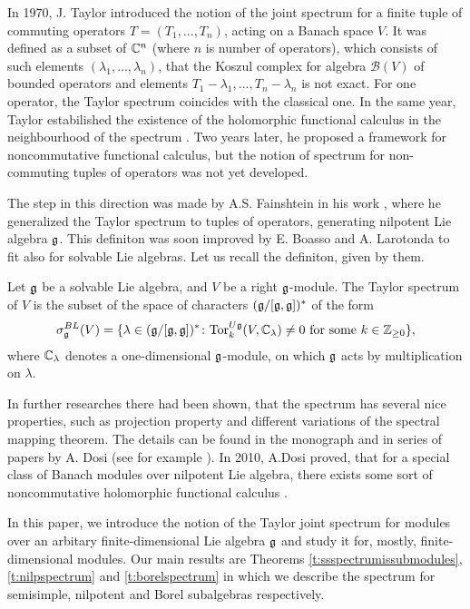 In 1970, J. Taylor\cite{Taylor1970} introduced the notion of the joint spectrum for a finite tuple
of commuting operators $T = (T_1,...,T_n)$, acting on a Banach space $V$. It was defined as a
subset of $\mathbb{C}^n$ (where $n$ is number of operators), which consists of such elements
$(\lambda_1,...,\lambda_n)$, that the Koszul complex for algebra $\mathcal{B}(V)$ of bounded
operators and elements $T_1 - \lambda_1,...,T_n - \lambda_n$ is not exact. For one operator, the
Taylor spectrum coincides with the classical one. In the same year, Taylor estabilished the
existence of the holomorphic functional calculus in the neighbourhood of the spectrum
\cite{Taylor1970b}. Two years later, he proposed a framework for noncommutative functional
calculus\cite{Taylor1972}, but the notion of spectrum for non-commuting tuples of operators was not
yet developed. 

The step in this direction was made by A.S. Fainshtein in his work \cite{Fainshtein}, where he
generalized the Taylor spectrum to tuples of operators, generating nilpotent Lie algebra $\mathfrak{g}$.
This definiton was soon improved by E. Boasso and A. Larotonda \cite{boasso} to fit also for solvable Lie
algebras. Let us recall the definiton, given by them.
\begin{definition}
    Let $\mathfrak{g}$ be a solvable Lie algebra, and $V$ be a right $\mathfrak{g}$-module. The Taylor spectrum
    of $V$ is the subset of the space of characters $(\mathfrak{g}/[\mathfrak{g},\mathfrak{g}])^*$ of the form
    \begin{equation} \label{e:boassolarotonda}
        \sigma^{BL}_{\mathfrak{g}}(V) = \{ \lambda \in (\mathfrak{g}/[\mathfrak{g},\mathfrak{g}])^*\colon \mathrm{Tor}^{U\mathfrak{g}}_k(V,
            \mathbb{C}_\lambda)\neq 0 \text{ for some } k \in \mathbb{Z}_{\geq0}\},
    \end{equation}
    where $\mathbb{C}_\lambda$ denotes a one-dimensional $\mathfrak{g}$-module, on which $\mathfrak{g}$ acts by
    multiplication on $\lambda$.
\end{definition}
In further researches there had been shown, that the spectrum has several nice properties, such as
projection property and different variations of the spectral mapping theorem. The details can be
found in the monograph \cite{beltita} and in series of papers by A. Dosi (see for example
\cite{Dosi1}\cite{Dosi2}\cite{Dosi3}). In 2010, A.Dosi proved, that for a special class of Banach
modules over nilpotent Lie algebra, there exists some sort of noncommutative holomorphic functional
calculus \cite{Dosi4}.

In this paper, we introduce the notion of the Taylor joint spectrum for modules over an
arbitary finite-dimensional Lie algebra $\mathfrak{g}$ and study it for, mostly, finite-dimensional
modules. Our main results are Theorems \ref{t:ssspectrumissubmodules}, \ref{t:nilpspectrum} and
\ref{t:borelspectrum} in which we describe the spectrum for semisimple, nilpotent and Borel
subalgebras respectively.   
